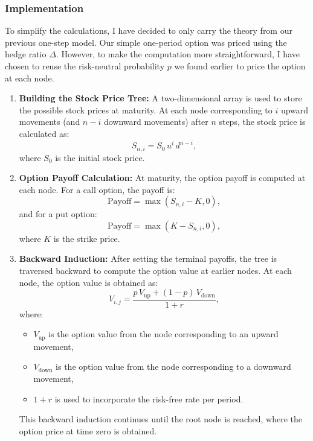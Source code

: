 \documentclass{article}
\begin{document}
    \subsubsection{Implementation}

    To simplify the calculations, I have decided to only carry the theory from our previous one-step model.
    Our simple one-period option was priced using the hedge ratio \(\Delta\). 
    However, to make the computation more straightforward, I have chosen to reuse the risk-neutral probability \(p\) we found earlier to price the option at each node.

    \begin{enumerate}
    
        \item \textbf{Building the Stock Price Tree:} A two-dimensional array is used to store the possible stock prices at maturity. At each node corresponding to \( i \) upward movements (and \( n-i \) downward movements) after \( n \) steps, the stock price is calculated as:
        \[
        S_{n,i} = S_0 \, u^i \, d^{n-i},
        \]
        where \( S_0 \) is the initial stock price.
        
        \item \textbf{Option Payoff Calculation:} At maturity, the option payoff is computed at each node. For a call option, the payoff is:
        \[
        \text{Payoff} = \max(S_{n,i} - K, 0),
        \]
        and for a put option:
        \[
        \text{Payoff} = \max(K - S_{n,i}, 0),
        \]
        where \( K \) is the strike price.
        
        \item \textbf{Backward Induction:} After setting the terminal payoffs, the tree is traversed backward to compute the option value at earlier nodes. At each node, the option value is obtained as:
        \[
        V_{i,j} = \frac{p \, V_{\text{up}} + (1 - p) \, V_{\text{down}}}{1 + r},
        \]
        where:
        \begin{itemize}
            \item \( V_{\text{up}} \) is the option value from the node corresponding to an upward movement,
            \item \( V_{\text{down}} \) is the option value from the node corresponding to a downward movement,
            \item \( 1 + r \) is used to incorporate the risk-free rate per period.
        \end{itemize}
        This backward induction continues until the root node is reached, where the option price at time zero is obtained.
    \end{enumerate}
\end{document}
